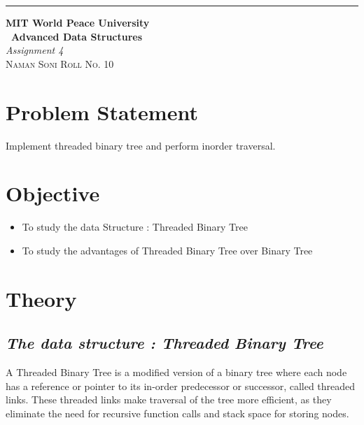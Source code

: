 \documentclass{article}
\begin{document}
\begin{titlepage} %
	
	\raggedleft\rule{1pt}{\textheight} %
	\hspace{0.05\textwidth} %
	\parbox[b]{0.75\textwidth}
	{ %
		
		{\Huge\bfseries MIT World Peace University \\[0.5\baselineskip] \ Advanced Data Structures}\\[2\baselineskip] %
		{\large\textit{Assignment 4}}\\[4\baselineskip] %
		{\Large\textsc{Naman Soni Roll No. 10}} %
		
		\vspace{0.5\textheight} %
	}
	
\end{titlepage}
\tableofcontents
\pagebreak
\section{\textbf{Problem Statement}}
Implement threaded binary tree and perform inorder traversal.
\section{\textbf{Objective}}
\begin{itemize}
	\item To study the data Structure : Threaded Binary Tree
	\item To study the advantages of Threaded Binary Tree over Binary Tree
\end{itemize}
\section{\textbf{Theory}}
\subsection{\textbf{\textit{The data structure : Threaded Binary Tree}}}
A Threaded Binary Tree is a modified version of a binary tree where each node has a reference or pointer to its in-order predecessor or successor, called threaded links. These threaded links make traversal of the tree more efficient, as they eliminate the need for recursive function calls and stack space for storing nodes.\\
\end{document}
